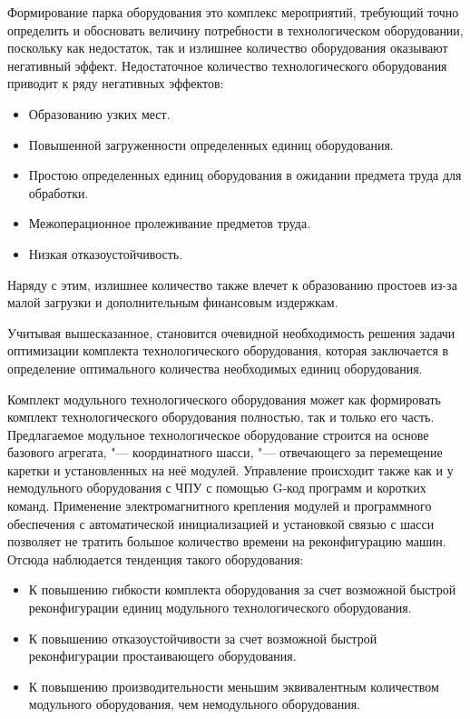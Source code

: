 Формирование парка оборудования это комплекс мероприятий, требующий точно определить и обосновать величину потребности в технологическом оборудовании, поскольку как недостаток, так и излишнее количество оборудования оказывают негативный эффект. Недостаточное количество технологического оборудования  приводит к ряду негативных эффектов:

\begin{itemize}
	\item Образованию узких мест.
	\item Повышенной загруженности определенных единиц оборудования.
	\item Простою определенных единиц оборудования в ожидании предмета труда для обработки.
	\item Межоперационное пролеживание предметов труда.
	\item Низкая отказоустойчивость.
\end{itemize}


Наряду с этим, излишнее количество также влечет к образованию простоев из-за малой загрузки и дополнительным финансовым издержкам. 

Учитывая вышесказанное, становится очевидной необходимость решения задачи оптимизации комплекта технологического оборудования, которая заключается в  определение оптимального количества необходимых единиц оборудования.

Комплект модульного технологического оборудования может как формировать комплект технологического оборудования полностью, так и только его часть. Предлагаемое модульное технологическое оборудование строится на основе базового агрегата, "--- координатного шасси, "--- отвечающего за перемещение каретки и установленных на неё модулей. Управление происходит также как и у немодульного оборудования с ЧПУ с помощью G-код программ и коротких команд. Применение электромагнитного крепления модулей и программного обеспечения с автоматической инициализацией и установкой связью с шасси позволяет не тратить большое количество времени на реконфигурацию машин. Отсюда наблюдается тенденция такого оборудования:

\begin{itemize}
	\item К повышению гибкости комплекта оборудования за счет возможной быстрой реконфигурации единиц модульного технологического оборудования.
	\item К повышению отказоустойчивости за счет возможной быстрой реконфигурации простаивающего оборудования.
	\item К повышению производительности меньшим эквивалентным количеством модульного оборудования, чем немодульного оборудования.
\end{itemize}

